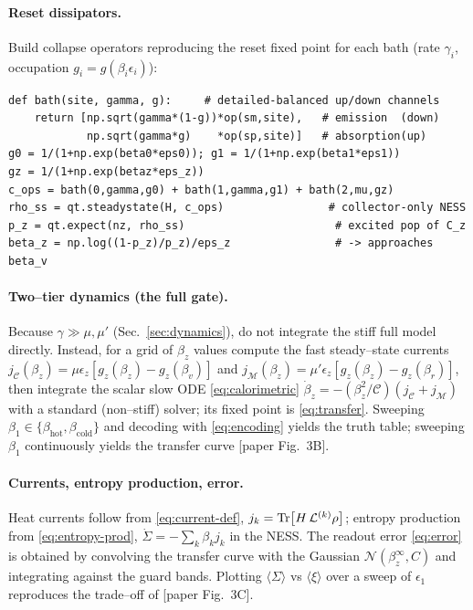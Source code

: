 \documentclass[11pt,a4paper]{article}
\newcommand{\calL}{\mathcal{L}}
\newcommand{\calC}{\mathcal{C}}
\newcommand{\calM}{\mathcal{M}}
\newcommand{\gz}{g_z}
\theoremstyle{definition}
\theoremstyle{remark}
\begin{document}
\paragraph{Reset dissipators.} Build collapse operators reproducing the
reset fixed point for each bath (rate $\gamma_i$, occupation
$g_i=g(\beta_i\epsilon_i)$):
\begin{verbatim}
def bath(site, gamma, g):     # detailed-balanced up/down channels
    return [np.sqrt(gamma*(1-g))*op(sm,site),   # emission  (down)
            np.sqrt(gamma*g)    *op(sp,site)]   # absorption(up)
g0 = 1/(1+np.exp(beta0*eps0)); g1 = 1/(1+np.exp(beta1*eps1))
gz = 1/(1+np.exp(betaz*eps_z))
c_ops = bath(0,gamma,g0) + bath(1,gamma,g1) + bath(2,mu,gz)
rho_ss = qt.steadystate(H, c_ops)                # collector-only NESS
p_z = qt.expect(nz, rho_ss)                       # excited pop of C_z
beta_z = np.log((1-p_z)/p_z)/eps_z                # -> approaches beta_v
\end{verbatim}

\paragraph{Two--tier dynamics (the full gate).} Because
$\gamma\gg\mu,\mu'$ (Sec.~\ref{sec:dynamics}), do not integrate the stiff
full model directly. Instead, for a grid of $\beta_z$ values compute the
fast steady--state currents
$j_{\calC}(\beta_z)=\mu\epsilon_z[\gz(\beta_z)-\gz(\beta_v)]$ and
$j_\calM(\beta_z)=\mu'\epsilon_z[\gz(\beta_z)-\gz(\beta_r)]$, then
integrate the scalar slow ODE \eqref{eq:calorimetric}
$\dot\beta_z=-(\beta_z^2/\calC)(j_{\calC}+j_\calM)$ with a standard
(non--stiff) solver; its fixed point is \eqref{eq:transfer}. Sweeping
$\beta_1\in\{\beta_{\mathrm{hot}},\beta_{\mathrm{cold}}\}$ and decoding
with \eqref{eq:encoding} yields the truth table; sweeping $\beta_1$
continuously yields the transfer curve [paper Fig.~3B].

\paragraph{Currents, entropy production, error.} Heat currents follow
from \eqref{eq:current-def}, $j_k=\Tr[H\,\calL^{(k)}\rho]$; entropy
production from \eqref{eq:entropy-prod},
$\dot\Sigma=-\sum_k\beta_k j_k$ in the NESS. The readout error
\eqref{eq:error} is obtained by convolving the transfer curve with the
Gaussian $\mathcal N(\beta_z^\infty,C)$ and integrating against the guard
bands. Plotting $\langle\Sigma\rangle$ vs $\langle\xi\rangle$ over a
sweep of $\epsilon_1$ reproduces the trade--off of [paper Fig.~3C].
\end{document}
